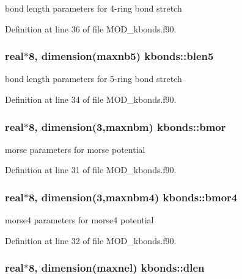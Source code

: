 bond length parameters for 4-\/ring bond stretch 



Definition at line 36 of file M\-O\-D\-\_\-kbonds.\-f90.

\hypertarget{classkbonds_a5feaf96447df676481cc06acb221c02f}{
\subsubsection[{blen5}]{\setlength{\rightskip}{0pt plus 5cm}real$\ast$8, dimension({\bf maxnb5}) kbonds\-::blen5}}\label{classkbonds_a5feaf96447df676481cc06acb221c02f}


bond length parameters for 5-\/ring bond stretch 



Definition at line 34 of file M\-O\-D\-\_\-kbonds.\-f90.

\hypertarget{classkbonds_a177252a3554425a3c0e0ba3032adead6}{
\subsubsection[{bmor}]{\setlength{\rightskip}{0pt plus 5cm}real$\ast$8, dimension(3,{\bf maxnbm}) kbonds\-::bmor}}\label{classkbonds_a177252a3554425a3c0e0ba3032adead6}


morse parameters for morse potential 



Definition at line 31 of file M\-O\-D\-\_\-kbonds.\-f90.

\hypertarget{classkbonds_aa21c00518a1013918014dcba5f0e6798}{
\subsubsection[{bmor4}]{\setlength{\rightskip}{0pt plus 5cm}real$\ast$8, dimension(3,{\bf maxnbm4}) kbonds\-::bmor4}}\label{classkbonds_aa21c00518a1013918014dcba5f0e6798}


morse4 parameters for morse4 potential 



Definition at line 32 of file M\-O\-D\-\_\-kbonds.\-f90.

\hypertarget{classkbonds_a045e5974050bfb0a5fc0cffa235150b8}{
\subsubsection[{dlen}]{\setlength{\rightskip}{0pt plus 5cm}real$\ast$8, dimension({\bf maxnel}) kbonds\-::dlen}}\label{classkbonds_a045e5974050bfb0a5fc0cffa235150b8}


